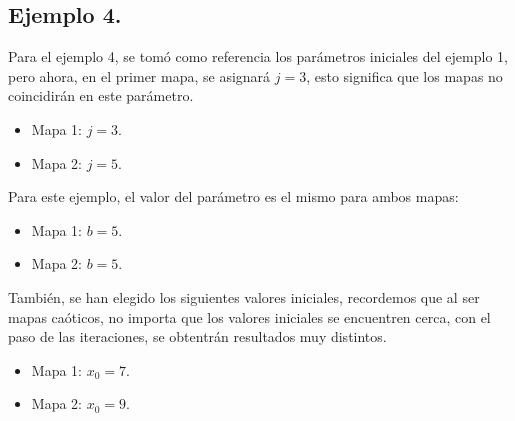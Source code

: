\documentclass[10pt]{IEEEtran}
\begin{document}
\subsection{Ejemplo 4.}
Para el ejemplo 4, se tomó como referencia los parámetros iniciales del ejemplo 1, pero ahora, en el primer mapa, se asignará  $j=3$, esto significa que los mapas no coincidirán en este parámetro.



\begin{itemize}
\item Mapa 1: $j =  3$.
\item Mapa 2: $j =  5$.
\end{itemize}

Para este ejemplo, el valor del parámetro es el mismo para ambos mapas:

\begin{itemize}
\item Mapa 1: $b =  5$.
\item Mapa 2: $b =  5$.
\end{itemize}

También, se han elegido los siguientes valores iniciales, recordemos que al ser mapas caóticos, no importa que los valores iniciales se encuentren cerca, con el paso de las iteraciones, se obtentrán resultados muy distintos.

\begin{itemize}
\item Mapa 1: $x_{0} = 7$.
\item Mapa 2: $x_{0} = 9$.
\end{itemize}
\end{document}
